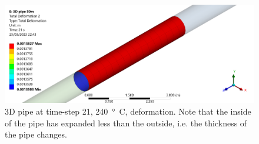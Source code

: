 \begin{figure}[H]
    \centering
    \includegraphics[width=\textwidth]{img/part1c-2.png}
    \caption{3D pipe at time-step 21, \SI{240}{\degree C}, deformation. Note that the inside of the pipe has expanded less than the outside, i.e. the thickness of the pipe changes.}
    \label{part1c3}
\end{figure}%
